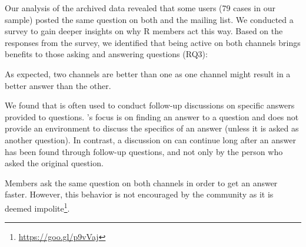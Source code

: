Our analysis of the archived data revealed that some users (79 cases in our sample) posted the same question on both \SO and the \RH mailing list. We conducted a survey to gain deeper insights on why R members act this way. Based on the responses from the survey, we identified that being active on both channels brings benefits to those asking and answering questions (RQ3):

\begin{description}[itemsep=2pt, topsep=0pt, leftmargin=1em, parsep=0pt]
\item[Find a better answer:] As expected, two channels are better than one as 
  one channel might result in a better answer than the other.
\item[Support follow-up questions:] We found that \RH is often used to conduct follow-up discussions on
  specific answers provided to \SO questions. \SO's focus is on finding an answer to a question and does not
  provide an environment to discuss the specifics of an answer (unless it is asked as another question).
In contrast, a discussion on \RH can continue long after an answer has been found through follow-up questions, and not only by the person who asked the original question.  
\item[Speed up answers:] Members ask the same question on both channels in order to get an answer faster. However, this behavior is not encouraged by the community as it is deemed impolite\footnote{\href{https://goo.gl/p9vVaj}{https://goo.gl/p9vVaj}}.
\end{description}





